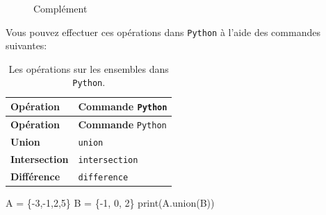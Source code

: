 \documentclass[
  letterpaper,
]{scrbook}
\newenvironment{Shaded}{}{}
\newcommand{\BuiltInTok}[1]{#1}
\newcommand{\DecValTok}[1]{\textcolor[rgb]{0.25,0.63,0.44}{#1}}
\newcommand{\NormalTok}[1]{#1}
\newcommand{\OperatorTok}[1]{\textcolor[rgb]{0.40,0.40,0.40}{#1}}
\theoremstyle{definition}
\theoremstyle{definition}
\theoremstyle{plain}
\theoremstyle{remark}
\begin{document}
\begin{figure}
\begin{minipage}[t]{0.50\linewidth}
{\centering 


\caption{Complément}

}

\end{minipage}%

\end{figure}

Vous pouvez effectuer ces opérations dans \texttt{Python} à l'aide des
commandes suivantes:

\hypertarget{tbl-operations-ensembles-python}{}
\begin{longtable}[]{@{}ll@{}}
\caption{\label{tbl-operations-ensembles-python}Les opérations sur les
ensembles dans \texttt{Python}.}\tabularnewline
\toprule()
\textbf{Opération} & \textbf{Commande} \texttt{Python} \\
\midrule()
\endfirsthead
\toprule()
\textbf{Opération} & \textbf{Commande} \texttt{Python} \\
\midrule()
\endhead
\textbf{Union} & \texttt{union} \\
\textbf{Intersection} & \texttt{intersection} \\
\textbf{Différence} & \texttt{difference} \\
\bottomrule()
\end{longtable}

\hypertarget{union-python}{}
\begin{Shaded}
\begin{Highlighting}[]
\NormalTok{A }\OperatorTok{=}\NormalTok{ \{}\OperatorTok{{-}}\DecValTok{3}\NormalTok{,}\OperatorTok{{-}}\DecValTok{1}\NormalTok{,}\DecValTok{2}\NormalTok{,}\DecValTok{5}\NormalTok{\}}
\NormalTok{B }\OperatorTok{=}\NormalTok{ \{}\OperatorTok{{-}}\DecValTok{1}\NormalTok{, }\DecValTok{0}\NormalTok{, }\DecValTok{2}\NormalTok{\}}
\BuiltInTok{print}\NormalTok{(A.union(B))}
\end{Highlighting}
\end{Shaded}
\end{document}
